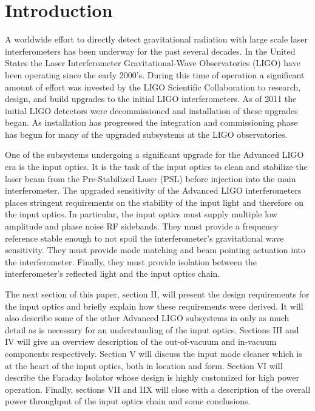 
\section{Introduction}
\label{sec:introduction}

A worldwide effort to directly detect gravitational radiation with large scale laser interferometers 
has been underway for the past several decades.  
In the United States the Laser Interferometer Gravitational-Wave Observatories (LIGO) have been operating
since the early 2000's.  
During this time of operation a significant amount of effort was invested by the LIGO Scientific Collaboration 
to research, design, and build upgrades to the initial LIGO interferometers.  
As of 2011 the initial LIGO detectors were decommissioned and installation of these upgrades began.  
As installation has progressed the integration and commissioning phase has begun for many of the 
upgraded subsystems at the LIGO observatories.  

One of the subsystems undergoing a significant upgrade for the Advanced LIGO era is 
the input optics.  
It is the task of the input optics to clean and stabilize the laser beam from the 
Pre-Stabilized Laser (PSL) before injection into the main interferometer.  
The upgraded sensitivity of the Advanced LIGO interferometers places stringent requirements on 
the stability of the input light and therefore on the input optics.  
In particular, the input optics must supply multiple low amplitude and phase noise RF sidebands.  
They must provide a frequency reference stable enough to not spoil the interferometer's 
gravitational wave sensitivity.  
They must provide mode matching and beam pointing actuation into the interferometer.  
Finally, they must provide isolation between the interferometer's reflected light and the 
input optics chain.  

The next section of this paper, section II, will present the design requirements for the input optics and 
briefly explain how these requirements were derived.  
It will also describe some of the other Advanced LIGO subsystems in only as much detail as 
is necessary for an understanding of the input optics.  
Sections III and IV will give an overview description of the out-of-vacuum and in-vacuum 
components respectively.  
Section V will discuss the input mode cleaner which is at the heart of the input optics, 
both in location and form.  
Section VI will describe the Faraday Isolator whose design is highly customized for high power 
operation.  
Finally, sections VII and IIX will close with a description of the overall power throughput of the 
input optics chain and some conclusions.  

